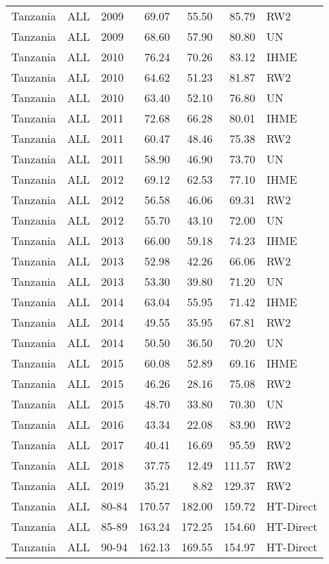 \begin{longtable}{lllrrrl}
  Tanzania & ALL & 2009 & 69.07 & 55.50 & 85.79 & RW2 \\ 
  Tanzania & ALL & 2009 & 68.60 & 57.90 & 80.80 & UN \\ 
  Tanzania & ALL & 2010 & 76.24 & 70.26 & 83.12 & IHME \\ 
  Tanzania & ALL & 2010 & 64.62 & 51.23 & 81.87 & RW2 \\ 
  Tanzania & ALL & 2010 & 63.40 & 52.10 & 76.80 & UN \\ 
  Tanzania & ALL & 2011 & 72.68 & 66.28 & 80.01 & IHME \\ 
  Tanzania & ALL & 2011 & 60.47 & 48.46 & 75.38 & RW2 \\ 
  Tanzania & ALL & 2011 & 58.90 & 46.90 & 73.70 & UN \\ 
  Tanzania & ALL & 2012 & 69.12 & 62.53 & 77.10 & IHME \\ 
  Tanzania & ALL & 2012 & 56.58 & 46.06 & 69.31 & RW2 \\ 
  Tanzania & ALL & 2012 & 55.70 & 43.10 & 72.00 & UN \\ 
  Tanzania & ALL & 2013 & 66.00 & 59.18 & 74.23 & IHME \\ 
  Tanzania & ALL & 2013 & 52.98 & 42.26 & 66.06 & RW2 \\ 
  Tanzania & ALL & 2013 & 53.30 & 39.80 & 71.20 & UN \\ 
  Tanzania & ALL & 2014 & 63.04 & 55.95 & 71.42 & IHME \\ 
  Tanzania & ALL & 2014 & 49.55 & 35.95 & 67.81 & RW2 \\ 
  Tanzania & ALL & 2014 & 50.50 & 36.50 & 70.20 & UN \\ 
  Tanzania & ALL & 2015 & 60.08 & 52.89 & 69.16 & IHME \\ 
  Tanzania & ALL & 2015 & 46.26 & 28.16 & 75.08 & RW2 \\ 
  Tanzania & ALL & 2015 & 48.70 & 33.80 & 70.30 & UN \\ 
  Tanzania & ALL & 2016 & 43.34 & 22.08 & 83.90 & RW2 \\ 
  Tanzania & ALL & 2017 & 40.41 & 16.69 & 95.59 & RW2 \\ 
  Tanzania & ALL & 2018 & 37.75 & 12.49 & 111.57 & RW2 \\ 
  Tanzania & ALL & 2019 & 35.21 & 8.82 & 129.37 & RW2 \\ 
  Tanzania & ALL & 80-84 & 170.57 & 182.00 & 159.72 & HT-Direct \\ 
  Tanzania & ALL & 85-89 & 163.24 & 172.25 & 154.60 & HT-Direct \\ 
  Tanzania & ALL & 90-94 & 162.13 & 169.55 & 154.97 & HT-Direct \\ 

\end{longtable}
